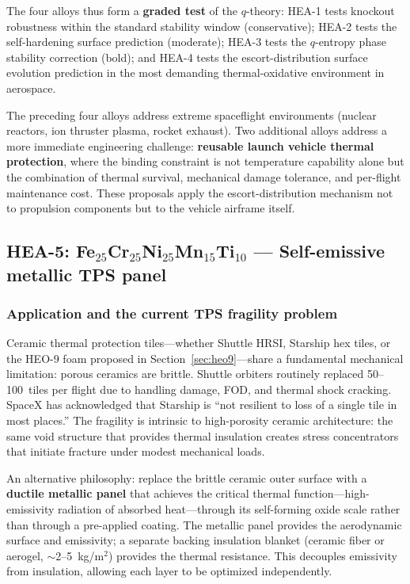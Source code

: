 \documentclass[12pt,letterpaper]{article}
\theoremstyle{definition}
\begin{document}
The four alloys thus form a \textbf{graded test} of the $q$-theory: HEA-1 tests knockout robustness within the standard stability window (conservative); HEA-2 tests the self-hardening surface prediction (moderate); HEA-3 tests the $q$-entropy phase stability correction (bold); and HEA-4 tests the escort-distribution surface evolution prediction in the most demanding thermal-oxidative environment in aerospace.

The preceding four alloys address extreme spaceflight environments (nuclear reactors, ion thruster plasma, rocket exhaust).  Two additional alloys address a more immediate engineering challenge: \textbf{reusable launch vehicle thermal protection}, where the binding constraint is not temperature capability alone but the combination of thermal survival, mechanical damage tolerance, and per-flight maintenance cost.  These proposals apply the escort-distribution mechanism not to propulsion components but to the vehicle airframe itself.


\subsection{HEA-5: Fe$_{25}$Cr$_{25}$Ni$_{25}$Mn$_{15}$Ti$_{10}$ --- Self-emissive metallic TPS panel}\label{sec:hea5}

\subsubsection{Application and the current TPS fragility problem}

Ceramic thermal protection tiles---whether Shuttle HRSI, Starship hex tiles, or the HEO-9 foam proposed in Section~\ref{sec:heo9}---share a fundamental mechanical limitation: porous ceramics are brittle.  Shuttle orbiters routinely replaced 50--100~tiles per flight due to handling damage, FOD, and thermal shock cracking.  SpaceX has acknowledged that Starship is ``not resilient to loss of a single tile in most places.''  The fragility is intrinsic to high-porosity ceramic architecture: the same void structure that provides thermal insulation creates stress concentrators that initiate fracture under modest mechanical loads.

An alternative philosophy: replace the brittle ceramic outer surface with a \textbf{ductile metallic panel} that achieves the critical thermal function---high-emissivity radiation of absorbed heat---through its self-forming oxide scale rather than through a pre-applied coating.  The metallic panel provides the aerodynamic surface and emissivity; a separate backing insulation blanket (ceramic fiber or aerogel, $\sim$2--5~kg/m$^2$) provides the thermal resistance.  This decouples emissivity from insulation, allowing each layer to be optimized independently.
\end{document}
